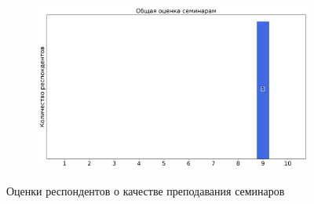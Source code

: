 \begin{figure}[H]
\begin{subfigure}[b]{0.45\textwidth}
			\end{subfigure}
			\begin{subfigure}[b]{0.45\textwidth}
				\centering
				\includegraphics[width=\textwidth]{images/4 course/Квантовая механика/seminarists-marks-Дудинец И.В.-3.png}
			\end{subfigure}	
			\caption{Оценки респондентов о качестве преподавания семинаров}
		\end{figure}


